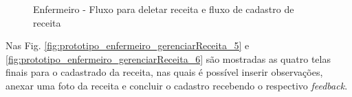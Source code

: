 \begin{figure}[H]
    \centering
    \caption{Enfermeiro - Fluxo para deletar receita e fluxo de cadastro de receita}
\end{figure}

Nas Fig. \ref{fig:prototipo_enfermeiro_gerenciarReceita_5} e \ref{fig:prototipo_enfermeiro_gerenciarReceita_6} são mostradas as quatro telas finais para o cadastrado da receita, nas quais é possível inserir observações, anexar uma foto da receita e concluir o cadastro recebendo o respectivo \textit{feedback}.

